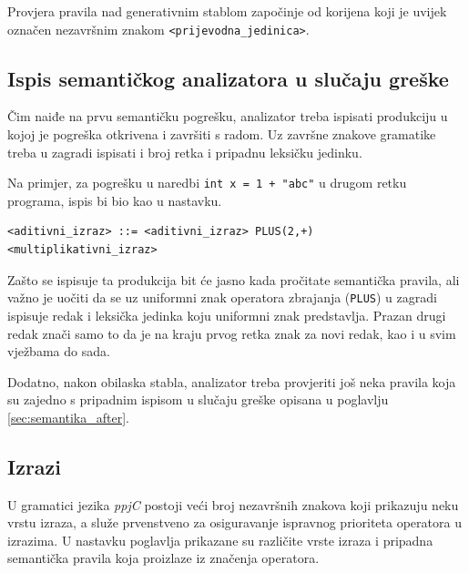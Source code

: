 \documentclass[times, 12pt, utf8]{book}
\begin{document}
Provjera pravila nad generativnim stablom započinje od korijena koji je uvijek označen nezavršnim znakom \verb|<prijevodna_jedinica>|.

\subsection{Ispis semantičkog analizatora u slučaju greške}
Čim naiđe na prvu semantičku pogrešku, analizator treba ispisati produkciju u kojoj je pogreška otkrivena i završiti s radom.
Uz završne znakove gramatike treba u zagradi ispisati i broj retka i pripadnu leksičku jedinku.

Na primjer, za pogrešku u naredbi \verb|int x = 1 + "abc"| u drugom retku programa, ispis bi bio kao u nastavku.

\begin{lstlisting}[caption={Primjer ispisa.},label=lst:semantika_ispis]
<aditivni_izraz> ::= <aditivni_izraz> PLUS(2,+) <multiplikativni_izraz>

\end{lstlisting}

Zašto se ispisuje ta produkcija bit će jasno kada pročitate semantička pravila, ali važno je uočiti da se uz uniformni znak operatora zbrajanja (\verb|PLUS|) u zagradi ispisuje redak i leksička jedinka koju uniformni znak predstavlja.
Prazan drugi redak znači samo to da je na kraju prvog retka znak za novi redak, kao i u svim vježbama do sada.

Dodatno, nakon obilaska stabla, analizator treba provjeriti još neka pravila koja su zajedno s pripadnim ispisom u slučaju greške opisana u poglavlju \ref{sec:semantika_after}.

\subsection{Izrazi}
U gramatici jezika \emph{ppjC} postoji veći broj nezavršnih znakova koji prikazuju neku vrstu izraza, a služe prvenstveno za osiguravanje ispravnog prioriteta operatora u izrazima.
U nastavku poglavlja prikazane su različite vrste izraza i pripadna semantička pravila koja proizlaze iz značenja operatora.
\end{document}
